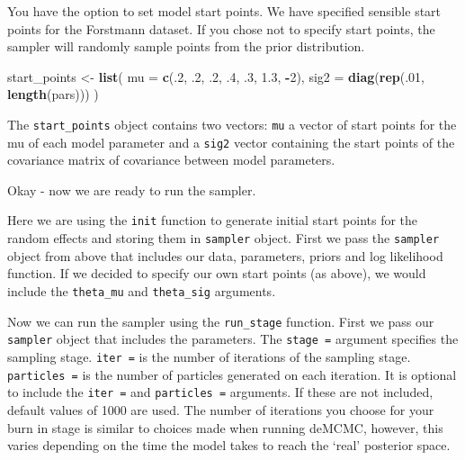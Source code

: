 \documentclass[]{book}
\newenvironment{Shaded}{\begin{snugshade}}{\end{snugshade}}
\newcommand{\KeywordTok}[1]{\textcolor[rgb]{0.13,0.29,0.53}{\textbf{#1}}}
\newcommand{\DataTypeTok}[1]{\textcolor[rgb]{0.13,0.29,0.53}{#1}}
\newcommand{\DecValTok}[1]{\textcolor[rgb]{0.00,0.00,0.81}{#1}}
\newcommand{\FloatTok}[1]{\textcolor[rgb]{0.00,0.00,0.81}{#1}}
\newcommand{\StringTok}[1]{\textcolor[rgb]{0.31,0.60,0.02}{#1}}
\newcommand{\OperatorTok}[1]{\textcolor[rgb]{0.81,0.36,0.00}{\textbf{#1}}}
\newcommand{\NormalTok}[1]{#1}
\begin{document}
You have the option to set model start points. We have specified
sensible start points for the Forstmann dataset. If you chose not to
specify start points, the sampler will randomly sample points from the
prior distribution.

\begin{Shaded}
\begin{Highlighting}[]
\NormalTok{start_points <-}\StringTok{ }\KeywordTok{list}\NormalTok{(}
  \DataTypeTok{mu =} \KeywordTok{c}\NormalTok{(.}\DecValTok{2}\NormalTok{, .}\DecValTok{2}\NormalTok{, .}\DecValTok{2}\NormalTok{, .}\DecValTok{4}\NormalTok{, .}\DecValTok{3}\NormalTok{, }\FloatTok{1.3}\NormalTok{, }\OperatorTok{-}\DecValTok{2}\NormalTok{),}
  \DataTypeTok{sig2 =} \KeywordTok{diag}\NormalTok{(}\KeywordTok{rep}\NormalTok{(.}\DecValTok{01}\NormalTok{, }\KeywordTok{length}\NormalTok{(pars)))}
\NormalTok{)}
\end{Highlighting}
\end{Shaded}

The \texttt{start\_points} object contains two vectors: \texttt{mu} a
vector of start points for the mu of each model parameter and a
\texttt{sig2} vector containing the start points of the covariance
matrix of covariance between model parameters.

Okay - now we are ready to run the sampler.

\begin{Shaded}
\end{Shaded}

Here we are using the \texttt{init} function to generate initial start
points for the random effects and storing them in \texttt{sampler}
object. First we pass the \texttt{sampler} object from above that
includes our data, parameters, priors and log likelihood function. If we
decided to specify our own start points (as above), we would include the
\texttt{theta\_mu} and \texttt{theta\_sig} arguments.

Now we can run the sampler using the \texttt{run\_stage} function. First
we pass our \texttt{sampler} object that includes the parameters. The
\texttt{stage\ =} argument specifies the sampling stage.
\texttt{iter\ =} is the number of iterations of the sampling stage.
\texttt{particles\ =} is the number of particles generated on each
iteration. It is optional to include the \texttt{iter\ =} and
\texttt{particles\ =} arguments. If these are not included, default
values of 1000 are used. The number of iterations you choose for your
burn in stage is similar to choices made when running deMCMC, however,
this varies depending on the time the model takes to reach the `real'
posterior space.
\end{document}
